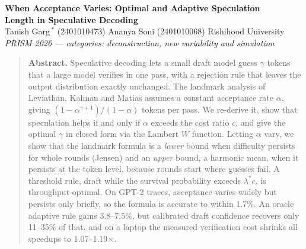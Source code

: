 \documentclass[11pt,letterpaper]{article}
\newcommand{\lstar}{\lambda^{*}}
\begin{document}
\begin{center}
{\LARGE\bfseries When Acceptance Varies: Optimal and Adaptive Speculation\\[2pt] Length in Speculative Decoding}\\[6pt]
{\large Tanish Garg\,$^{*}$ (2401010473) \quad Ananya Soni (2401010068) \quad Rishihood University}\\[3pt]
{\itshape PRISM 2026 --- categories: deconstruction, new variability and simulation}
\end{center}

\begingroup\renewcommand\thefootnote{$*$}
\endgroup

\vspace{-8pt}
\begin{quote}\small
\textbf{Abstract.} Speculative decoding lets a small draft model guess $\gamma$ tokens that a large model verifies in one pass, with a rejection rule that leaves the output distribution exactly unchanged. The landmark analysis of Leviathan, Kalman and Matias assumes a constant acceptance rate $\alpha$, giving $(1-\alpha^{\gamma+1})/(1-\alpha)$ tokens per pass. We re-derive it, show that speculation helps if and only if $\alpha$ exceeds the cost ratio $c$, and give the optimal $\gamma$ in closed form via the Lambert $W$ function. Letting $\alpha$ vary, we show that the landmark formula is a \emph{lower} bound when difficulty persists for whole rounds (Jensen) and an \emph{upper} bound, a harmonic mean, when it persists at the token level, because rounds start where guesses fail. A threshold rule, draft while the survival probability exceeds $\lstar c$, is throughput-optimal. On GPT-2 traces, acceptance varies widely but persists only briefly, so the formula is accurate to within 1.7\%. An oracle adaptive rule gains 3.8--7.5\%, but calibrated draft confidence recovers only 11--35\% of that, and on a laptop the measured verification cost shrinks all speedups to 1.07--1.19$\times$.
\end{quote}
\end{document}
